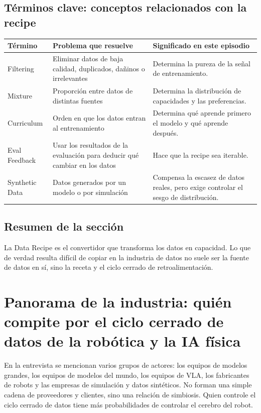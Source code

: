 \documentclass[a4paper]{article}
\begin{document}
\subsection{Términos clave: conceptos relacionados con la recipe}

\noindent\begin{tabularx}{\textwidth}{p{}p{}X}
\toprule
Término & Problema que resuelve & Significado en este episodio \\
\midrule
Filtering & Eliminar datos de baja calidad, duplicados, dañinos o irrelevantes & Determina la pureza de la señal de entrenamiento. \\
Mixture & Proporción entre datos de distintas fuentes & Determina la distribución de capacidades y las preferencias. \\
Curriculum & Orden en que los datos entran al entrenamiento & Determina qué aprende primero el modelo y qué aprende después. \\
Eval Feedback & Usar los resultados de la evaluación para deducir qué cambiar en los datos & Hace que la recipe sea iterable. \\
Synthetic Data & Datos generados por un modelo o por simulación & Compensa la escasez de datos reales, pero exige controlar el sesgo de distribución. \\
\bottomrule
\end{tabularx}

\subsection{Resumen de la sección}

La Data Recipe es el convertidor que transforma los datos en capacidad. Lo que de verdad resulta difícil de copiar en la industria de datos no suele ser la fuente de datos en sí, sino la receta y el ciclo cerrado de retroalimentación.
\section{Panorama de la industria: quién compite por el ciclo cerrado de datos de la robótica y la IA física}

En la entrevista se mencionan varios grupos de actores: los equipos de modelos grandes, los equipos de modelos del mundo, los equipos de VLA, los fabricantes de robots y las empresas de simulación y datos sintéticos. No forman una simple cadena de proveedores y clientes, sino una relación de simbiosis. Quien controle el ciclo cerrado de datos tiene más probabilidades de controlar el cerebro del robot.
\end{document}
